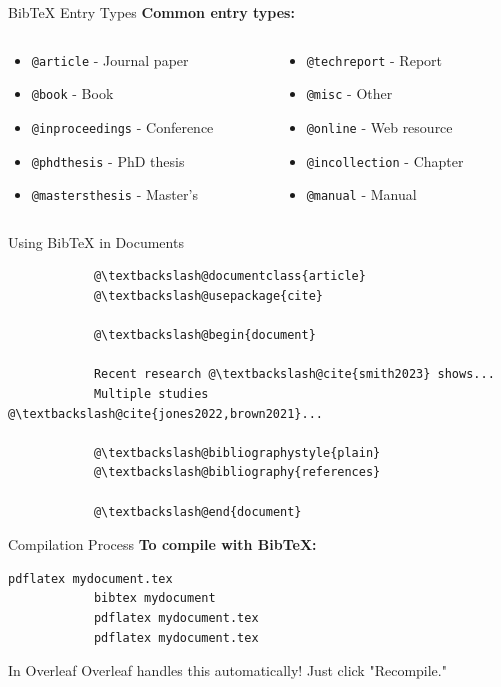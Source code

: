 \documentclass[aspectratio=169]{beamer}
\begin{document}
	\begin{frame}{BibTeX Entry Types}
		\textbf{Common entry types:}
		
		\begin{columns}
			\begin{column}{0.48\textwidth}
				\begin{itemize}
					\item \texttt{@article} - Journal paper
					\item \texttt{@book} - Book
					\item \texttt{@inproceedings} - Conference
					\item \texttt{@phdthesis} - PhD thesis
					\item \texttt{@mastersthesis} - Master's
				\end{itemize}
			\end{column}
			
			\begin{column}{0.48\textwidth}
				\begin{itemize}
					\item \texttt{@techreport} - Report
					\item \texttt{@misc} - Other
					\item \texttt{@online} - Web resource
					\item \texttt{@incollection} - Chapter
					\item \texttt{@manual} - Manual
				\end{itemize}
			\end{column}
		\end{columns}
	\end{frame}
	
	\begin{frame}[fragile]{Using BibTeX in Documents}
		\begin{lstlisting}
			@\textbackslash@documentclass{article}
			@\textbackslash@usepackage{cite}
			
			@\textbackslash@begin{document}
			
			Recent research @\textbackslash@cite{smith2023} shows...
			Multiple studies @\textbackslash@cite{jones2022,brown2021}...
			
			@\textbackslash@bibliographystyle{plain}
			@\textbackslash@bibliography{references}
			
			@\textbackslash@end{document}
		\end{lstlisting}
	\end{frame}
	
	\begin{frame}[fragile]{Compilation Process}
		\textbf{To compile with BibTeX:}
		
		\begin{lstlisting}[language=bash]
			pdflatex mydocument.tex
			bibtex mydocument
			pdflatex mydocument.tex
			pdflatex mydocument.tex
		\end{lstlisting}
		
		\vspace{1em}
		
		\begin{block}{In Overleaf}
			Overleaf handles this automatically! Just click "Recompile."
		\end{block}
	\end{frame}
	
\end{document}
